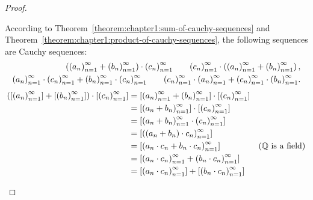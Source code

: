 \begin{proof}
\begin{enumerate}[label={(F\arabic*)},itemsep=0pt,start=5]
              According to Theorem~\ref{theorem:chapter1:sum-of-cauchy-sequences} and Theorem~\ref{theorem:chapter1:product-of-cauchy-sequences}, the following sequences are Cauchy sequences:
              \[
                  \begin{split}
                      \left({\left({a_{n}}\right)}^{\infty}_{n=1} + {\left({b_{n}}\right)}^{\infty}_{n=1}\right)\cdot{\left({c_{n}}\right)}^{\infty}_{n=1} \qquad {\left({c_{n}}\right)}^{\infty}_{n=1}\cdot\left({\left({a_{n}}\right)}^{\infty}_{n=1} + {\left({b_{n}}\right)}^{\infty}_{n=1}\right), \\
                      {\left({a_{n}}\right)}^{\infty}_{n=1}\cdot{\left({c_{n}}\right)}^{\infty}_{n=1} + {\left({b_{n}}\right)}^{\infty}_{n=1}\cdot{\left({c_{n}}\right)}^{\infty}_{n=1} \qquad {\left({c_{n}}\right)}^{\infty}_{n=1}\cdot{\left({a_{n}}\right)}^{\infty}_{n=1} + {\left({c_{n}}\right)}^{\infty}_{n=1}\cdot{\left({b_{n}}\right)}^{\infty}_{n=1}.
                  \end{split}
              \]
              \begin{align*}
                  \left(\class{\seq{a_{n}}} + \class{\seq{b_{n}}}\right)\cdot\class{\seq{c_{n}}} & = \class{\seq{a_{n}} + \seq{b_{n}}}\cdot\class{\seq{c_{n}}}                                                                     \\
                                                                                                 & = \class{\seq{a_{n} + b_{n}}}\cdot\class{\seq{c_{n}}}                                                                           \\
                                                                                                 & = \class{\seq{a_{n} + b_{n}}\cdot\seq{c_{n}}}                                                                                   \\
                                                                                                 & = \class{\seq{(a_{n} + b_{n})\cdot c_{n}}}                                                                                      \\
                                                                                                 & = \class{\seq{a_{n}\cdot c_{n} + b_{n}\cdot c_{n}}}                                          & \text{($\mathbb{Q}$ is a field)} \\
                                                                                                 & = \class{\seq{a_{n}\cdot c_{n}} + \seq{b_{n}\cdot c_{n}}}                                                                       \\
                                                                                                 & = \class{\seq{a_{n}\cdot c_{n}}} + \class{\seq{b_{n}\cdot c_{n}}}                                                               \\

\end{align*}
\end{enumerate}
\end{proof}
